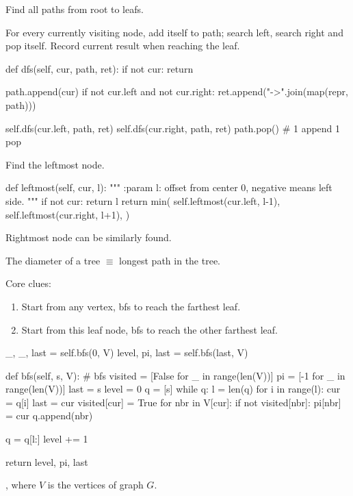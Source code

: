  Find all paths from root to leafs. 

For every currently visiting node, add itself to path; search left, search right and pop itself. Record current result when reaching the leaf.
\begin{python}
def dfs(self, cur, path, ret):
    if not cur:
        return

    path.append(cur)
    if not cur.left and not cur.right:
        ret.append("->".join(map(repr, path)))

    self.dfs(cur.left, path, ret)
    self.dfs(cur.right, path, ret)
    path.pop()  # 1 append 1 pop
\end{python}

 Find the leftmost node. 
\begin{python}
def leftmost(self, cur, l):
    """
    :param l: offset from center 0, negative means left side. 
    """
    if not cur:
        return l
    return min(
        self.leftmost(cur.left, l-1), 
        self.leftmost(cur.right, l+1),
    )
\end{python}

Rightmost node can be similarly found.

 The diameter of a tree $\equiv$ longest path in the tree.

Core clues:
\begin{enumerate}
\item Start from any vertex, bfs to reach the farthest leaf.
\item Start from this leaf node, bfs to reach the other farthest leaf. 
\end{enumerate}
\begin{python}
_, _, last = self.bfs(0, V)
level, pi, last = self.bfs(last, V)

def bfs(self, s, V):
    # bfs
    visited = [False for _ in range(len(V))]
    pi = [-1 for _ in range(len(V))]
    last = s
    level = 0
    q = [s]
    while q:
        l = len(q)
        for i in range(l):
            cur = q[i]
            last = cur
            visited[cur] = True
            for nbr in V[cur]:
                if not visited[nbr]:
                    pi[nbr] = cur
                    q.append(nbr)

        q = q[l:]
        level += 1

    return level, pi, last
\end{python}

, where $V$ is the vertices of graph $G$.

